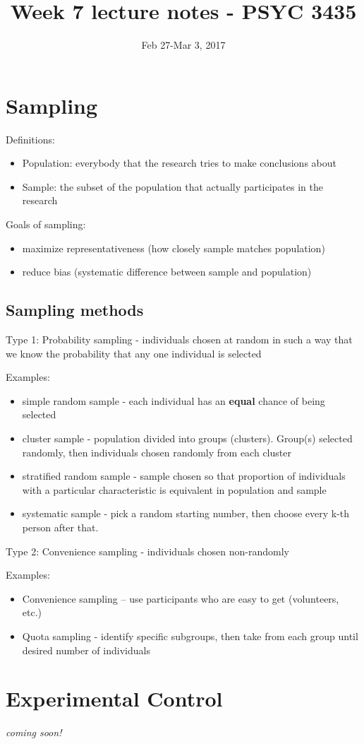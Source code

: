 \documentclass[11pt]{article}
\date{Feb 27-Mar 3, 2017}
\title{Week 7 lecture notes - PSYC 3435}
\begin{document}
\maketitle

\section*{Sampling}
\label{sec-1}

Definitions:
\begin{itemize}
\item Population: everybody that the research tries to make conclusions about
\item Sample: the subset of the population that actually participates in the research
\end{itemize}

Goals of sampling:
\begin{itemize}
\item maximize representativeness (how closely sample matches population)
\item reduce bias (systematic difference between sample and population)
\end{itemize}

\subsection*{Sampling methods}
\label{sec-1-1}
Type 1: Probability sampling - individuals chosen at random in such a way that we know the probability that any one individual is selected

Examples:
\begin{itemize}
\item simple random sample - each individual has an \textbf{equal} chance of being selected
\item cluster sample - population divided into groups (clusters). Group(s) selected randomly, then individuals chosen randomly from each cluster
\item stratified random sample - sample chosen so that proportion of individuals with a particular characteristic is equivalent in population and sample
\item systematic sample - pick a random starting number, then choose every k-th person after that.
\end{itemize}

Type 2: Convenience sampling - individuals chosen non-randomly

Examples: 
\begin{itemize}
\item Convenience sampling -- use participants who are easy to get (volunteers, etc.)
\item Quota sampling - identify specific subgroups, then take from each group until desired number of individuals
\end{itemize}

\section*{Experimental Control}
\label{sec-2}
\emph{coming soon!}
\end{document}

